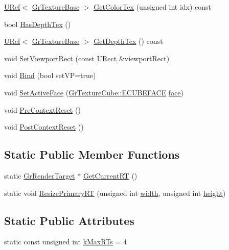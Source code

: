 \begin{CompactItemize}
\begin{CompactItemize}
\item 
\hyperlink{class_u_ref}{URef}$<$ \hyperlink{class_gr_texture_base}{GrTextureBase} $>$ \hyperlink{class_gr_render_target_880ba8f3d25b4217fcc324a985adc5ce}{GetColorTex} (unsigned int idx) const 
\item 
bool \hyperlink{class_gr_render_target_7948316d0f8d2a1712f6e031ef1a4d59}{HasDepthTex} ()
\item 
\hyperlink{class_u_ref}{URef}$<$ \hyperlink{class_gr_texture_base}{GrTextureBase} $>$ \hyperlink{class_gr_render_target_90b86b630acf5808df5402faf13cbcff}{GetDepthTex} () const 
\item 
void \hyperlink{class_gr_render_target_f4eee673395d2d5bacf6d54cdbf709fb}{SetViewportRect} (const \hyperlink{class_u_rect}{URect} \&viewportRect)
\item 
void \hyperlink{class_gr_render_target_26ee9e8fef318184bbf038f4b718f746}{Bind} (bool setVP=true)
\item 
void \hyperlink{class_gr_render_target_fbe2a4a66992e0a5b969b5e464bd120d}{SetActiveFace} (\hyperlink{class_gr_texture_cube_49c6f83c73520edfce04f4eb5dcfe6a0}{GrTextureCube::ECUBEFACE} \hyperlink{glext_8h_676ca580c460c0154eb58200433d2a9e}{face})
\item 
void \hyperlink{class_gr_render_target_5eaf686fa2fe311e716c4e3b8e97f5ed}{PreContextReset} ()
\item 
void \hyperlink{class_gr_render_target_9f94b394daefa8da7daeb3e089ca61ee}{PostContextReset} ()
\end{CompactItemize}
\subsection*{Static Public Member Functions}
\begin{CompactItemize}
\item 
static \hyperlink{class_gr_render_target}{GrRenderTarget} $\ast$ \hyperlink{class_gr_render_target_0bf3b1509691c2567d9b0f01a29f42d4}{GetCurrentRT} ()
\item 
static void \hyperlink{class_gr_render_target_8b9ab6e93c0037d2d594dbd0249e56cf}{ResizePrimaryRT} (unsigned int \hyperlink{wglext_8h_e6531b1788ca42a9ae8155b0c52e7630}{width}, unsigned int \hyperlink{wglext_8h_b2e63df950c3789599e1e43f477bc9e3}{height})
\end{CompactItemize}
\subsection*{Static Public Attributes}
\begin{CompactItemize}
\item 
static const unsigned int \hyperlink{class_gr_render_target_63e0c545fefc37935cd22a93e6388bda}{kMaxRTs} = 4
\end{CompactItemize}



\end{CompactItemize}

